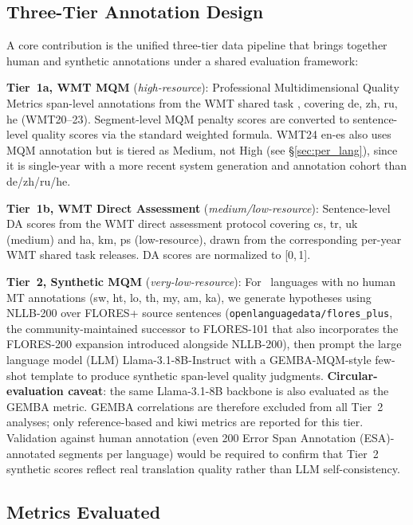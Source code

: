\documentclass[11pt]{article}
\begin{document}
\subsection{Three-Tier Annotation Design}

A core contribution is the unified three-tier data pipeline that brings together human and synthetic annotations under a shared evaluation framework:

\textbf{Tier~1a, WMT MQM} (\textit{high-resource}): Professional Multidimensional Quality Metrics span-level annotations from the WMT shared task \cite{freitag2021experts}, covering de, zh, ru, he (WMT20--23). Segment-level MQM penalty scores are converted to sentence-level quality scores via the standard weighted formula. WMT24 en-es also uses MQM annotation but is tiered as Medium, not High (see \S\ref{sec:per_lang}), since it is single-year with a more recent system generation and annotation cohort than de/zh/ru/he.

\textbf{Tier~1b, WMT Direct Assessment} (\textit{medium/low-resource}): Sentence-level DA scores from the WMT direct assessment protocol \cite{graham2017crowd} covering cs, tr, uk (medium) and ha, km, ps (low-resource), drawn from the corresponding per-year WMT shared task releases. DA scores are normalized to [0,\,1].

\label{sec:tier2}\textbf{Tier~2, Synthetic MQM} (\textit{very-low-resource}): For \NumTierTwoLanguages\ languages with no human MT annotations (sw, ht, lo, th, my, am, ka), we generate hypotheses using NLLB-200 \cite{costa2022no} over FLORES+ \cite{goyal2022flores,costa2022no} source sentences (\texttt{openlanguagedata/flores\_plus}, the community-maintained successor to FLORES-101 that also incorporates the FLORES-200 expansion introduced alongside NLLB-200), then prompt the large language model (LLM) Llama-3.1-8B-Instruct \cite{dubey2024llama3} with a GEMBA-MQM-style few-shot template \cite{kocmi2023gembamqm} to produce synthetic span-level quality judgments. \textbf{Circular-evaluation caveat}: the same Llama-3.1-8B backbone is also evaluated as the GEMBA metric. GEMBA correlations are therefore excluded from all Tier~2 analyses; only reference-based and kiwi metrics are reported for this tier. Validation against human annotation (even 200 Error Span Annotation (ESA)-annotated segments per language) would be required to confirm that Tier~2 synthetic scores reflect real translation quality rather than LLM self-consistency.

\subsection{Metrics Evaluated}
\end{document}
